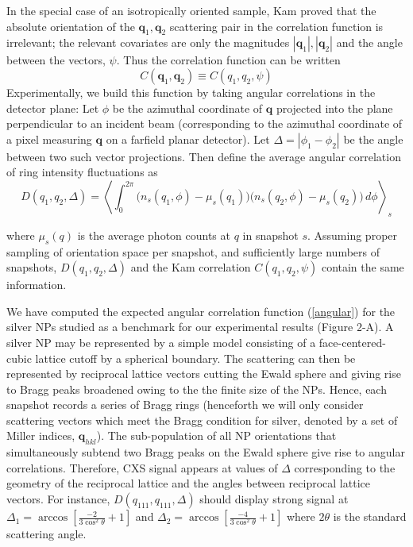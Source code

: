 \documentclass [11pt,fleqn]{article}
\def \be {\begin{equation}}
\def \ee {\end{equation}}
\begin{document}
In the special case of an isotropically oriented sample, Kam proved that the absolute orientation of the $\bm q_1, \bm q_2$ scattering pair in the correlation function is irrelevant; the relevant covariates are only the magnitudes $| \bm q_1 | , | \bm q_2 | $ and the angle between the vectors, $\psi$. Thus the correlation function can be written 
\[
C(\bm q_1, \bm q_2)  \equiv C (q_1,q_2, \psi  )
\]
Experimentally, we build this function by taking angular correlations in the detector plane: Let $\phi$ be the azimuthal coordinate of $\bm q$ projected into the plane perpendicular to an incident beam (corresponding to the azimuthal coordinate of a pixel measuring $\bm q$ on a farfield planar detector). Let $\Delta = |\phi_{1} - \phi_{2}|$ be the angle between two such vector projections. Then define the average angular correlation of ring intensity fluctuations as
\be \label{angular}
D (q_1,q_2, \Delta  ) = \left \langle \int_{0}^{2\pi}  \Big ( n_s(q_1,\phi) -   \mu_s( q_1) \Big) \Big ( n_s(q_2,\phi) -   \mu_s( q_2) \Big)  \, d\phi  \right \rangle_{s}
\ee

where $\mu_s( q)$ is the average photon counts at $q$ in snapshot $s$. Assuming proper sampling of orientation space per snapshot, and sufficiently large numbers of snapshots, $D (q_1,q_2, \Delta  )$ and the Kam correlation $C (q_1,q_2, \psi  )$ contain the same information.

We have computed the expected angular correlation function (\ref{angular}) for the silver NPs studied as a benchmark for our experimental results (Figure 2-A). A silver NP may be represented by a simple model consisting of a face-centered-cubic lattice cutoff by a spherical boundary. The scattering can then be represented by reciprocal lattice vectors cutting the Ewald sphere and giving rise to Bragg peaks broadened owing to the the finite size of the NPs. Hence, each snapshot records a series of Bragg rings (henceforth we will only consider scattering vectors which meet the Bragg condition for silver, denoted by a set of Miller indices, $\bm q_{hkl}$). The sub-population of all NP orientations that simultaneously subtend two Bragg peaks on the Ewald sphere give rise to angular correlations. Therefore,  CXS signal appears at values of $\Delta $ corresponding to the geometry of the reciprocal lattice and the angles between reciprocal lattice vectors. For instance, $D (q_{111},q_{111}, \Delta  )$ should display strong signal at $\Delta_1 = \arccos[ \frac{-2}{3\cos^{2}\theta} + 1  ]$ and $\Delta_2 = \arccos[ \frac{-4}{3\cos^{2}\theta} + 1  ]$ where $2\theta$ is the standard scattering angle.
\end{document}
